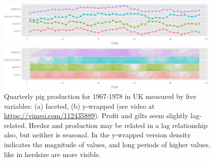 \documentclass[12pt]{article}
\begin{document}
\begin{center}
\begin{figure}[htp]
\begin{centering}
\includegraphics[width=0.98\textwidth]{graph/pipeline-17-original-wp-l}
\end{centering}

\begin{centering}
\includegraphics[width=0.98\textwidth]{graph/pipeline-17-ywrap-w}
\end{centering}

\caption{\label{fig:y-wrapping}Quarterly pig production for 1967-1978 in UK measured by five variables: (a) faceted, (b) y-wrapped (see video at \url{https://vimeo.com/112435889}). Profit and gilts seem slightly lag-related. Herdsz and production may be related in a lag relationship also, but neither is seasonal. In the y-wrapped version density indicates the magnitude of values, and long periods of higher values, like in herdsize are more visible. }
\end{figure}

\end{center}
\end{document}
